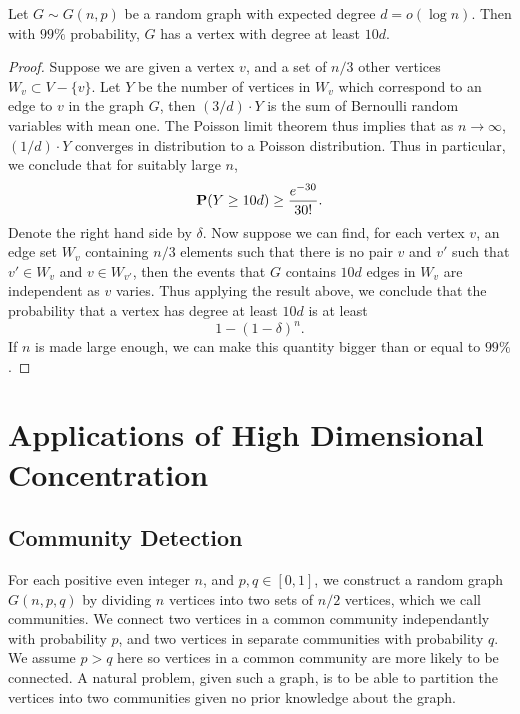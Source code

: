 \begin{theorem}
    Let $G \sim G(n,p)$ be a random graph with expected degree $d = o(\log n)$. Then with $99\%$ probability, $G$ has a vertex with degree at least $10d$.
\end{theorem}
\begin{proof}
    Suppose we are given a vertex $v$, and a set of $n/3$ other vertices $W_v \subset V - \{ v \}$. Let $Y$ be the number of vertices in $W_v$ which correspond to an edge to $v$ in the graph $G$, then $(3/d) \cdot Y$ is the sum of Bernoulli random variables with mean one. The Poisson limit theorem thus implies that as $n \to \infty$, $(1/d) \cdot Y$ converges in distribution to a Poisson distribution. Thus in particular, we conclude that for suitably large $n$,
    \[ \operatorname{\mathbf{P}}( Y \geq 10 d ) \geq \frac{e^{- 30}}{30!}. \]
    Denote the right hand side by $\delta$. Now suppose we can find, for each vertex $v$, an edge set $W_v$ containing $n/3$ elements such that there is no pair $v$ and $v'$ such that $v' \in W_v$ and $v \in W_{v'}$, then the events that $G$ contains $10d$ edges in $W_v$ are independent as $v$ varies. Thus applying the result above, we conclude that the probability that a vertex has degree at least $10d$ is at least
    \[ 1 - (1 - \delta)^{n}. \]
    If $n$ is made large enough, we can make this quantity bigger than or equal to $99\%$.
\end{proof}








\chapter{Applications of High Dimensional Concentration}

\section{Community Detection}

For each positive even integer $n$, and $p,q \in [0,1]$, we construct a random graph $G(n,p,q)$ by dividing $n$ vertices into two sets of $n/2$ vertices, which we call communities. We connect two vertices in a common community independantly with probability $p$, and two vertices in separate communities with probability $q$. We assume $p > q$ here so vertices in a common community are more likely to be connected. A natural problem, given such a graph, is to be able to partition the vertices into two communities given no prior knowledge about the graph.

